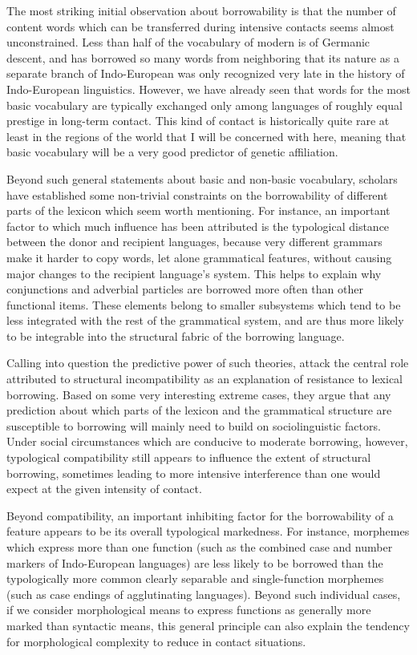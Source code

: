 The most striking initial observation about borrowability is that the number of content words which can be transferred during intensive contacts seems almost unconstrained. Less than half of the vocabulary of modern  is of Germanic descent, and  has borrowed so many words from neighboring  that its nature as a separate branch of Indo-European was only recognized very late in the history of Indo-European linguistics. However, we have already seen that words for the most basic vocabulary are typically exchanged only among languages of roughly equal prestige in long-term contact. This kind of contact is historically quite rare at least in the regions of the world that I will be concerned with here, meaning that basic vocabulary will be a very good predictor of genetic affiliation.

Beyond such general statements about basic and non-basic vocabulary, scholars have established some non-trivial constraints on the borrowability of different parts of the lexicon which seem worth mentioning. For instance, an important factor to which much influence has been attributed is the typological distance between the donor and recipient languages, because very different grammars make it harder to copy words, let alone grammatical features, without causing major changes to the recipient language's system. This helps to explain why conjunctions and adverbial particles are borrowed more often than other functional items. These elements belong to smaller subsystems which tend to be less integrated with the rest of the grammatical system, and are thus more likely to be integrable into the structural fabric of the borrowing language.

Calling into question the predictive power of such theories, \citet{thomason_kaufman_1988} attack the central role attributed to structural incompatibility as an explanation of resistance to lexical borrowing. Based on some very interesting extreme cases, they argue that any prediction about which parts of the lexicon and the grammatical structure are susceptible to borrowing will mainly need to build on sociolinguistic factors. Under social circumstances which are conducive to moderate borrowing, however, typological compatibility still appears to influence the extent of structural borrowing, sometimes leading to more intensive interference than one would expect at the given intensity of contact.

Beyond compatibility, an important inhibiting factor for the borrowability of a feature appears to be its overall typological markedness. For instance, morphemes which express more than one function (such as the combined case and number markers of Indo-European languages) are less likely to be borrowed than the typologically more common clearly separable and single-function morphemes (such as case endings of agglutinating languages). Beyond such individual cases, if we consider morphological means to express functions as generally more marked than syntactic means, this general principle can also explain the tendency for morphological complexity to reduce in contact situations.

